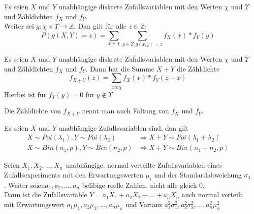 \documentclass[10pt]{article}
\newtheorem[M]{definition}{Def.}
\newtheorem[M]{satz}{Satz}
\numberwithin{equation}{section}
\newcommand{\ZN}{\mathbb{Z}} %
\begin{document}
\begin{satz} 
Es seien $X$ und $Y$ unabhängige diskrete Zufallsvariablen mit den Werten $\chi$ und $\Upsilon$ und Zähldichten $f_X$ und $f_Y$. \\
Weiter sei $g: \chi \times \Upsilon \rightarrow\ZN$. Dan gilt für alle $z \in \ZN$:
\begin{equation}
P(g(X,Y) = z) = \sum_{x \in \chi} \sum_{y\in \Upsilon:g(x,y)=z} f_X(x) * f_Y(y)
\end{equation}
\end{satz}

\begin{satz} 
Es seien $X$ und $Y$ unabhängige diskrete Zufallsvariablen mit den Werten $\chi$ und $\Upsilon$ und Zähldichten $f_X$ und $f_Y$. Dann hat die Summe $X + Y$ die Zähldichte
\begin{equation}
f_{X+Y}(z) = \sum_{x in \chi} f_X(x) * f_Y(z-x)
\end{equation}
Hierbei ist für $f_Y(y)=0$ für $y \notin \Upsilon$
\end{satz}
Die Zähldichte von $f_{X+Y}$ nennt man auch Faltung von $f_X$ und $f_Y$.

\begin{satz} 
Es seien $X$ und $Y$ unabhängige Zufallsvariablen sind, dan gilt
\begin{align}
X \sim Poi(\lambda_1), Y \sim Poi(\lambda_2) &\Rightarrow X + Y \sim Poi(\lambda_1 + \lambda_2) \\
X \sim Bin(n_1,p), Y \sim Bin(n_2,p) &\Rightarrow X + Y \sim Bin(n_1 + n_2, p)
\end{align}
\end{satz}

\begin{satz}
Seien $X_1, X_2, \dots, X_n$ unabhängige, normal verteilte Zufallsvariablen eines Zufallsexperiments mit den Erwartungswerten $\mu_i$ und der Standardabweichung $\sigma_1$. Weiter seien$a_1,a_2, \dots, a_n$ belibige reelle Zahlen, nicht alle gleich 0. \\
Dann ist die Zufallsvariable $Y = a_1X_1 + a_2X_2 + \dots + a_nX_n$ auch normal verteilt mit Erwartungswert $a_1\mu_1,a_2\mu_2, \dots, a_n\mu_n$ und Varianz $a_1^2\sigma_1^2,a_2^2\sigma_2^2, \dots, a_n^2\mu_n^2$
\end{satz}
\end{document}
